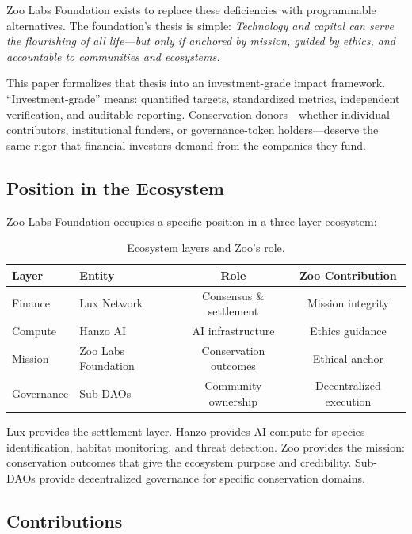 \documentclass[11pt,letterpaper]{article}
\begin{document}
Zoo Labs Foundation exists to replace these deficiencies with programmable alternatives. The foundation's thesis is simple: \emph{Technology and capital can serve the flourishing of all life---but only if anchored by mission, guided by ethics, and accountable to communities and ecosystems.}

This paper formalizes that thesis into an investment-grade impact framework. ``Investment-grade'' means: quantified targets, standardized metrics, independent verification, and auditable reporting. Conservation donors---whether individual contributors, institutional funders, or governance-token holders---deserve the same rigor that financial investors demand from the companies they fund.

\subsection{Position in the Ecosystem}

Zoo Labs Foundation occupies a specific position in a three-layer ecosystem:

\begin{table}[t]
\centering
\begin{tabular}{llcc}
\toprule
\textbf{Layer} & \textbf{Entity} & \textbf{Role} & \textbf{Zoo Contribution} \\
\midrule
Finance & Lux Network & Consensus \& settlement & Mission integrity \\
Compute & Hanzo AI & AI infrastructure & Ethics guidance \\
Mission & Zoo Labs Foundation & Conservation outcomes & Ethical anchor \\
Governance & Sub-DAOs & Community ownership & Decentralized execution \\
\bottomrule
\end{tabular}
\caption{Ecosystem layers and Zoo's role.}
\label{tab:ecosystem}
\end{table}

Lux provides the settlement layer. Hanzo provides AI compute for species identification, habitat monitoring, and threat detection. Zoo provides the mission: conservation outcomes that give the ecosystem purpose and credibility. Sub-DAOs provide decentralized governance for specific conservation domains.

\subsection{Contributions}
\end{document}
